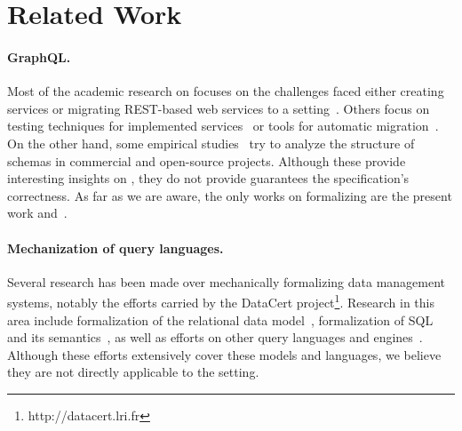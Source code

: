 \section{Related Work}\label{sec:related}

\paragraph{GraphQL.} Most of the academic research on \gql focuses on the challenges faced either creating \gql services or migrating REST-based web services to a \gql setting~\cite{improvingoeeu, ehriapi, gqlexperiences}. 
Others focus on testing techniques for implemented \gql services~\cite{gqldeviation} or tools for automatic migration~\cite{migratingapi}. 
On the other hand, some empirical studies~\cite{empiricalgql, empiricalapi} try to analyze the structure of schemas in commercial and open-source projects. 
Although these provide interesting insights on \gql, they do not provide guarantees \wrt the specification's correctness. 
As far as we are aware, the only works on formalizing \gql are the present work and~\cite{gqlph}.

\paragraph{Mechanization of query languages.} Several research has been made over mechanically formalizing data management systems, notably the efforts carried by the DataCert project\footnote{http://datacert.lri.fr}. 
Research in this area include formalization of the relational data model~\cite{relationalcoq}, formalization of SQL and its semantics~\cite{sqlequiv, hottsql, vesqlengines, vesqlsemantics}, 
as well as efforts on other query languages and engines~\cite{certifdatalog}. Although these efforts extensively cover these models and languages, we believe they are 
not directly applicable to the \gql setting. 

